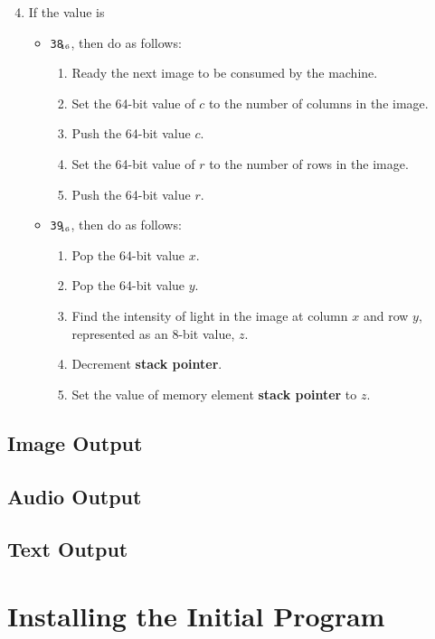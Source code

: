 \documentclass[a4paper,11pt]{article}
\newcommand{\SP}{\textbf{stack pointer}\xspace}
\newcommand{\num}[1]{\texttt{#1}\xspace}
\newcommand{\hex}[1]{\num{#1}$_{\textup{\tiny\hskip-1ex 16}}$\xspace}
\begin{document}
\begin{enumerate}
  \setcounter{enumi}{3}
\item If the value is
  \begin{itemize}
  \item \hex{38}, then do as follows:
    \begin{enumerate}
    \item Ready the next image to be consumed by the machine.
    \item Set the 64-bit value of $c$ to the number of columns in the image.
    \item Push the 64-bit value $c$.
    \item Set the 64-bit value of $r$ to the number of rows in the image.
    \item Push the 64-bit value $r$.
    \end{enumerate}
  \item \hex{39}, then do as follows:
    \begin{enumerate}
    \item Pop the 64-bit value $x$.
    \item Pop the 64-bit value $y$.
    \item Find the intensity of light in the image at column $x$ and row $y$, represented as an 8-bit value, $z$.
    \item Decrement \SP.
    \item Set the value of memory element \SP to $z$.
    \end{enumerate}
  \end{itemize}
\end{enumerate}

\subsection{Image Output}

\subsection{Audio Output}

\subsection{Text Output}

\section{Installing the Initial Program}
\end{document}
